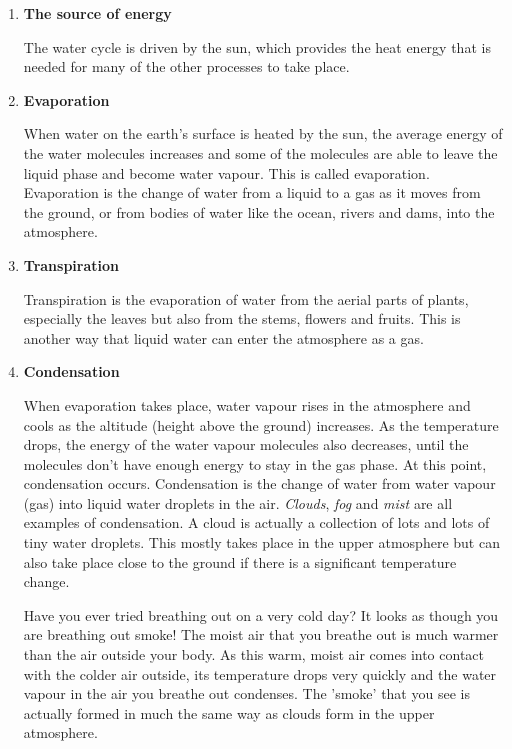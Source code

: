 \begin{enumerate}
\item{\textbf{The source of energy}

The water cycle is driven by the sun, which provides the heat energy that is needed for many of the other processes to take place.
}

\item{\textbf{Evaporation}

When water on the earth's surface is heated by the sun, the average energy of the water molecules increases and some of the molecules are able to leave the liquid phase and become water vapour. This is called evaporation. Evaporation is the change of water from a liquid to a gas as it moves from the ground, or from bodies of water like the ocean, rivers and dams, into the atmosphere.  
}

\item{\textbf{Transpiration}

Transpiration is the evaporation of water from the aerial parts of plants, especially the leaves but also from the stems, flowers and fruits. This is another way that liquid water can enter the atmosphere as a gas.
}

\item{\textbf{Condensation}

When evaporation takes place, water vapour rises in the atmosphere and cools as the altitude (height above the ground) increases. As the temperature drops, the energy of the water vapour molecules also decreases, until the molecules don't have enough energy to stay in the gas phase. At this point, condensation occurs. Condensation is the change of water from water vapour (gas) into liquid water droplets in the air. \textit{Clouds}, \textit{fog} and \textit{mist} are all examples of condensation. A cloud is actually a collection of lots and lots of tiny water droplets. This mostly takes place in the upper atmosphere but can also take place close to the ground if there is a significant temperature change.
}

\begin{IFact}
{Have you ever tried breathing out on a very cold day? It looks as though you are breathing out smoke! The moist air that you breathe out is much warmer than the air outside your body. As this warm, moist air comes into contact with the colder air outside, its temperature drops very quickly and the water vapour in the air you breathe out condenses. The 'smoke' that you see is actually formed in much the same way as clouds form in the upper atmosphere.
}
\end{IFact}


\end{enumerate}
